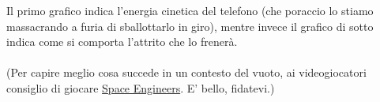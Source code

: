 \documentclass[12pt, a4paper, openany, oneside]{book}
\begin{document}
Il primo grafico indica l'energia cinetica del telefono (che poraccio lo stiamo
massacrando a furia di sballottarlo in giro), mentre invece il grafico di sotto
indica come si comporta l'attrito che lo frenerà.\\ \\
(Per capire meglio cosa succede in un contesto del vuoto, ai videogiocatori 
consiglio di giocare \href{https://store.steampowered.com/app/244850/Space_Engineers/}
{Space Engineers}. E' bello, fidatevi.) \\ \\
\end{document}
